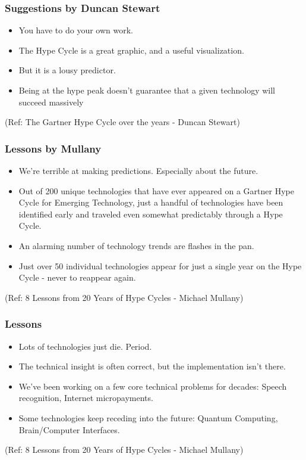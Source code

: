 \begin{frame}[fragile]\frametitle{Suggestions by Duncan Stewart}


\begin{itemize}

\item You have to do your own work. 
\item The Hype Cycle is a great graphic, and a useful visualization. 
\item But it is a lousy predictor. 
\item Being at the hype peak doesn’t guarantee that a given technology will succeed massively
\end{itemize}

{\tiny (Ref: The Gartner Hype Cycle over the years - Duncan Stewart)}


\end{frame}

\begin{frame}[fragile]\frametitle{Lessons by Mullany}


\begin{itemize}
\item  We're terrible at making predictions. Especially about the future. 
\item Out of 200 unique technologies that have ever appeared on a Gartner Hype Cycle for Emerging Technology, just a handful of technologies  have been identified early and traveled even somewhat predictably through a Hype Cycle.
\item An alarming number of technology trends are flashes in the pan. 
\item Just over 50 individual technologies appear for just a single year on the Hype Cycle - never to reappear again. 
\end{itemize}


{\tiny (Ref: 8 Lessons from 20 Years of Hype Cycles - Michael Mullany)}

\end{frame}

\begin{frame}[fragile]\frametitle{Lessons}


\begin{itemize}
\item Lots of technologies just die. Period. 
\item The technical insight is often correct, but the implementation isn't there.
\item We've been working on a few core technical problems for decades: Speech recognition, Internet micropayments.
\item Some technologies keep receding into the future: Quantum Computing, Brain/Computer Interfaces.
\end{itemize}


{\tiny (Ref: 8 Lessons from 20 Years of Hype Cycles - Michael Mullany)}

\end{frame}

